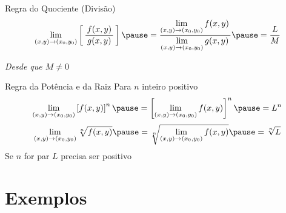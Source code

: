 \begin{frame}{Regra do Quociente (Divisão)}
  \[
    \lim_{(x, y)\to(x_0, y_0)} \left[ \,\frac{\,f(x, y)\,}{g(x, y)} \, \right]
    \pause =
    \dfrac{\displaystyle\lim_{(x, y)\to(x_0, y_0)} f(x, y)\,}
          {\displaystyle\lim_{(x, y)\to(x_0, y_0)} g(x, y)\,}
    \pause =
    \frac{L}{M}
  \]

  \pause
  \emph{Desde que \(M\neq 0\)}
\end{frame}

\begin{frame}{Regra da Potência e da Raiz}
  Para $n$ inteiro positivo
  \pause
  \[
    \lim_{(x, y)\to(x_0, y_0)} \left[f(x, y)\right]^n
    \pause =
    \left[\lim_{(x, y)\to(x_0, y_0)} f(x, y)\right]^n
    \pause =
    L^n
  \]
  \pause
  \vspace{\baselineskip}
  \[
    \lim_{(x, y)\to(x_0, y_0)} \sqrt[n]{f(x, y)}
    \pause =
    \sqrt[n]{\lim_{(x, y)\to(x_0, y_0)} f(x, y)}
    \pause =
    \sqrt[n]{L}
  \]
  \pause
  Se $n$ for par $L$ precisa ser positivo
\end{frame}


\section{Exemplos}

